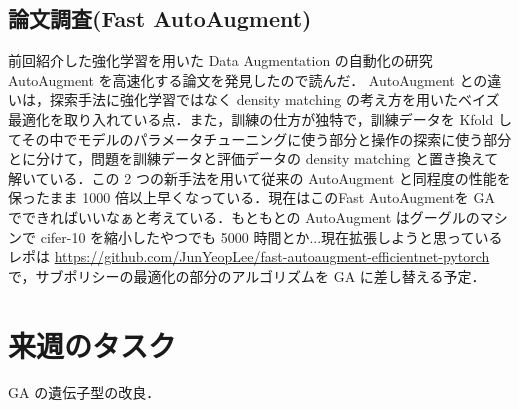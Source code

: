 \documentclass[onecolumn]{ujarticle}   %
\begin{document}
	\subsection{論文調査(Fast AutoAugment)}
	前回紹介した強化学習を用いた Data Augmentation の自動化の研究 AutoAugment を高速化する論文を発見したので読んだ\cite{DBLP:journals/corr/abs-1905-00397}．
	AutoAugment との違いは，探索手法に強化学習ではなく density matching の考え方を用いたベイズ最適化を取り入れている点．また，訓練の仕方が独特で，訓練データを Kfold してその中でモデルのパラメータチューニングに使う部分と操作の探索に使う部分とに分けて，問題を訓練データと評価データの density matching と置き換えて解いている．この 2 つの新手法を用いて従来の AutoAugment と同程度の性能を保ったまま 1000 倍以上早くなっている．現在はこのFast AutoAugmentを GA でできればいいなぁと考えている．もともとの AutoAugment はグーグルのマシンで cifer-10 を縮小したやつでも 5000 時間とか...現在拡張しようと思っているレポは \url{https://github.com/JunYeopLee/fast-autoaugment-efficientnet-pytorch} で，サブポリシーの最適化の部分のアルゴリズムを GA に差し替える予定．

	\section{来週のタスク}
	GA の遺伝子型の改良．

	
	
\end{document}
